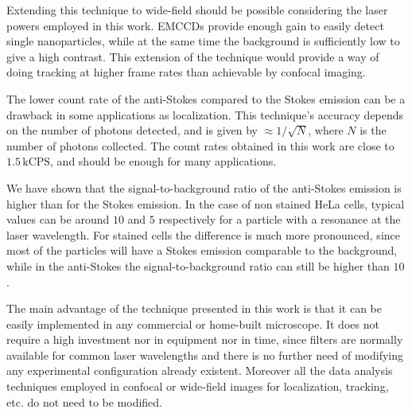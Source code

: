 \documentclass[journal=nalefd,manuscript=letter]{achemso}
\begin{document}
Extending this technique to wide-field should be possible considering the laser
powers employed in this work. EMCCDs provide enough gain to easily detect single
nanoparticles, while at the same time the background is sufficiently low to give
a high contrast. This extension of the technique would provide a way of doing
tracking at higher frame rates than achievable by confocal imaging.

The lower count rate of the anti-Stokes compared to the Stokes emission can be a
drawback in some applications as localization. This technique's accuracy depends 
on the number of photons detected, and is given by $\approx
1/\sqrt{N}$, where $N$ is the number of photons collected. The count rates
obtained in this work are close to $1.5\,\textrm{kCPS}$, and should be enough
for many applications. 

We have shown that the signal-to-background ratio of the anti-Stokes emission is
higher than for the Stokes emission. In the case of non stained HeLa cells,
typical values can be around $10$ and $5$ respectively for a particle with a
resonance at the laser wavelength. For stained cells the difference is
much more pronounced, since most of the particles will have a Stokes emission
comparable to the background, while in the anti-Stokes the signal-to-background
ratio can still be higher than $10$.

The main advantage of the technique presented in this work is that it can be
easily implemented in any commercial or home-built microscope. It does not
require a high investment nor in equipment nor in time, since filters are
normally available for common laser wavelengths and there is no further need of
modifying any experimental configuration already existent. Moreover all the data
analysis techniques employed in confocal or wide-field images for localization,
tracking, etc. do not need to be modified. 


{}
\end{document}
